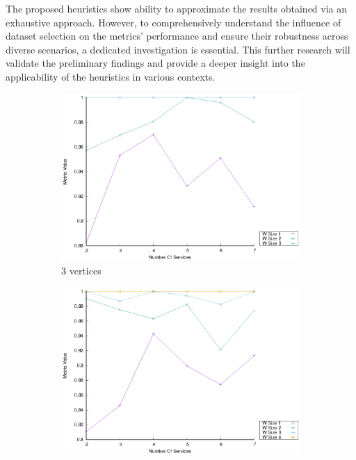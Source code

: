 The proposed heuristics show ability to approximate the results obtained via an exhaustive approach. However, to comprehensively understand the influence of dataset selection on the metrics' performance and ensure their robustness across diverse scenarios, a dedicated investigation is essential. This further research will validate the preliminary findings and provide a deeper insight into the applicability of the heuristics in various contexts.
\begin{figure}[!htb]
  \centering
  \begin{subfigure}{0.33\textwidth}
    \includegraphics[width=\textwidth]{Images/graphs/window_quality_performance_diff_perce_n7_s7_20_100_n3}
    \caption{3 vertices}
    \label{fig:quality_window_perce_wide_3n}
  \end{subfigure}
  \hfill
  \begin{subfigure}{0.33\textwidth}
    \includegraphics[width=\textwidth]{Images/graphs/window_quality_performance_diff_perce_n7_s7_20_100_n4}

\end{subfigure}
\end{figure}
